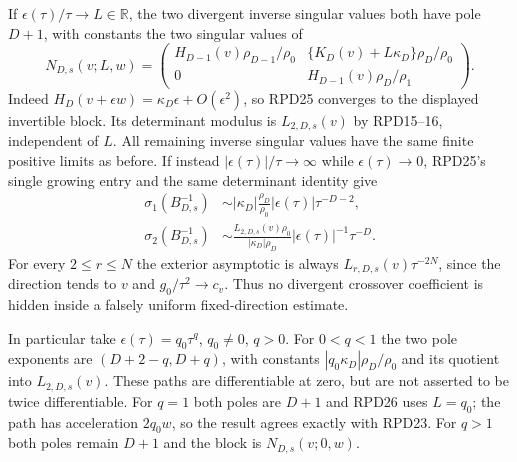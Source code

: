 If $\epsilon(\tau)/\tau\to L\in\mathbb R$, the two divergent
inverse singular values both have pole $D+1$, with constants the
two singular values of
\[
 N_{D,s}(v;L,w)=\begin{pmatrix}
 H_{D-1}(v)\rho_{D-1}/\rho_0&
 \{K_D(v)+L\kappa_D\}\rho_D/\rho_0\\
 0&H_{D-1}(v)\rho_D/\rho_1
 \end{pmatrix}.\tag{RPD26}
\]
Indeed $H_D(v+\epsilon w)=\kappa_D\epsilon+O(\epsilon^2)$,
so RPD25 converges to the displayed invertible block.  Its
determinant modulus is $L_{2,D,s}(v)$ by RPD15--16, independent
of $L$.  All remaining inverse singular values have the same
finite positive limits as before.  If instead
$|\epsilon(\tau)|/\tau\to\infty$ while $\epsilon(\tau)\to0$,
RPD25's single growing entry and the same determinant identity give
\[
 \begin{aligned}
 \sigma_1(B_{D,s}^{-1})&\sim
     |\kappa_D|\frac{\rho_D}{\rho_0}
                   |\epsilon(\tau)|\tau^{-D-2},\\
 \sigma_2(B_{D,s}^{-1})&\sim
     \frac{L_{2,D,s}(v)\rho_0}{|\kappa_D|\rho_D}
                   |\epsilon(\tau)|^{-1}\tau^{-D}.
 \end{aligned}\tag{RPD27}
\]
For every $2\le r\le N$ the exterior asymptotic is always
$L_{r,D,s}(v)\tau^{-2N}$, since the direction tends to $v$ and
$g_0/\tau^2\to c_v$.  Thus no divergent crossover coefficient is
hidden inside a falsely uniform fixed-direction estimate.

In particular take $\epsilon(\tau)=q_0\tau^q$, $q_0\ne0$, $q>0$.
For $0<q<1$ the two pole exponents are
$(D+2-q,D+q)$, with constants
$|q_0\kappa_D|\rho_D/\rho_0$ and its quotient into
$L_{2,D,s}(v)$.  These paths are differentiable at zero, but are
not asserted to be twice differentiable.  For $q=1$ both poles are
$D+1$ and RPD26 uses $L=q_0$; the path has acceleration $2q_0w$,
so the result agrees exactly with RPD23.  For $q>1$ both poles
remain $D+1$ and the block is $N_{D,s}(v;0,w)$.

